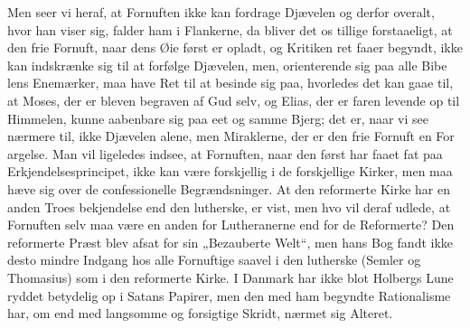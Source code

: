 \documentclass[12pt,a4paper]{article}
\newcommand{\opage}[1]{\marginnote{\footnotesize\textit{[#1]}}}
\begin{document}
Men seer vi heraf, at Fornuften ikke kan fordrage Djævelen
og derfor overalt, hvor han viser sig, falder ham i Flankerne, da
bliver det os tillige forstaaeligt, at den frie Fornuft, naar dens Øie
først er opladt, og Kritiken ret faaer begyndt, ikke kan indskrænke
sig til at forfølge Djævelen, men, orienterende sig paa alle Bibe\-%
\opage{26}lens Enemærker, maa have Ret til at besinde sig paa, hvorledes
det kan gaae til, at Moses, der er bleven begraven af Gud selv,
og Elias, der er faren levende op til Himmelen, kunne aabenbare
sig paa eet og samme Bjerg; det er, naar vi see nærmere til, ikke
Djævelen alene, men Miraklerne, der er den frie Fornuft en For\-%
argelse. Man vil ligeledes indsee, at Fornuften, naar den først
har faaet fat paa Erkjendelsesprincipet, ikke kan være forskjellig
i de forskjellige Kirker, men maa hæve sig over de confessionelle
Begrændsninger. At den reformerte Kirke har en anden Troes\-%
bekjendelse end den lutherske, er vist, men hvo vil deraf udlede,
at Fornuften selv maa være en anden for Lutheranerne end for de
Reformerte? Den reformerte Præst blev afsat for sin „Bezauberte
Welt“, men hans Bog fandt ikke desto mindre Indgang hos alle
Fornuftige saavel i den lutherske (Semler og Thomasius) som i
den reformerte Kirke. I Danmark har ikke blot Holbergs Lune
ryddet betydelig op i Satans Papirer, men den med ham begyndte
Rationalisme har, om end med langsomme og forsigtige Skridt,
nærmet sig Alteret.
\end{document}
